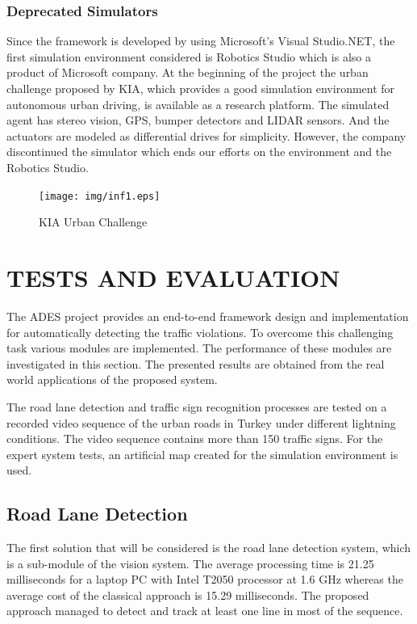 \documentclass[a4paper,oneside,12pt]{report}
\begin{document}
\subsection{Deprecated Simulators}
Since the framework is developed by using Microsoft's Visual Studio.NET, the first simulation environment considered is Robotics Studio which is also a product of Microsoft company. At the beginning of the project the urban challenge proposed by KIA, which provides a good simulation environment for autonomous urban driving, is available as a research platform. The simulated agent has stereo vision, GPS, bumper detectors and LIDAR sensors. And the actuators are modeled as differential drives for simplicity. However, the company discontinued the simulator which ends our efforts on the environment and the Robotics Studio.
\begin{figure}[ht]
\begin{center}
\texttt{[image: img/inf1.eps]}
\caption{KIA Urban Challenge}
\label{fig:inf1}
\end{center}
\end{figure}
\par

\chapter{TESTS AND EVALUATION}
\label{chapter:evaluation}
The ADES project provides an end-to-end framework design and implementation for automatically detecting the traffic violations. To overcome this challenging task various modules are implemented. The performance of these modules are investigated in this section. The presented results are obtained from the real world applications of the proposed system. 

The road lane detection and traffic sign recognition processes are tested on a recorded video sequence of the urban roads in Turkey under different lightning conditions. The video sequence contains more than 150 traffic signs. For the expert system tests, an artificial map created for the simulation environment is used.

\section{Road Lane Detection}
The first solution that will be considered is the road lane detection system, which is a sub-module of the vision system. The average processing time is 21.25 milliseconds for a laptop PC with Intel T2050 processor at 1.6 GHz whereas the average cost of the classical approach is 15.29 milliseconds. The proposed approach managed to detect and track at least one line in most of the sequence. 
\end{document}
